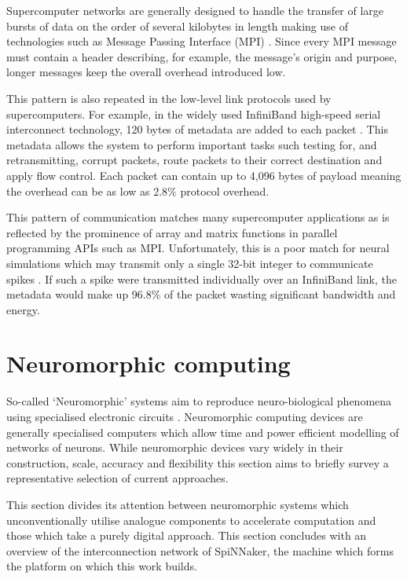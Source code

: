 				Supercomputer networks are generally designed to handle the transfer of
				large bursts of data on the order of several kilobytes in length making
				use of technologies such as Message Passing Interface (MPI)
				\cite{mpiforum12}. Since every MPI message must contain a header
				describing, for example, the message's origin and purpose, longer
				messages keep the overall overhead introduced low.
				
				This pattern is also repeated in the low-level link protocols used by
				supercomputers.  For example, in the widely used InfiniBand
				high-speed serial interconnect technology, 120 bytes of metadata are
				added to each packet \cite{infinibandta08}. This metadata allows the
				system to perform important tasks such testing for, and retransmitting,
				corrupt packets, route packets to their correct destination and apply
				flow control. Each packet can contain up to 4,096 bytes of payload
				meaning the overhead can be as low as 2.8\% protocol overhead.
				
				This pattern of communication matches many supercomputer applications
				as is reflected by the prominence of array and matrix functions in
				parallel programming APIs such as MPI. Unfortunately, this is a poor
				match for neural simulations which may transmit only a single 32-bit
				integer to communicate spikes \cite{davies12}. If such a spike were
				transmitted individually over an InfiniBand link, the metadata would
				make up 96.8\% of the packet wasting significant bandwidth and energy.
				
	
	
	\section{Neuromorphic computing}
		
		So-called `Neuromorphic' systems aim to reproduce neuro-biological phenomena
		using specialised electronic circuits \cite{mead90}. Neuromorphic computing
		devices are generally specialised computers which allow time and power
		efficient modelling of networks of neurons. While neuromorphic devices vary
		widely in their construction, scale, accuracy and flexibility this section
		aims to briefly survey a representative selection of current approaches.
		
		This section divides its attention between neuromorphic systems which
		unconventionally utilise analogue components to accelerate computation and
		those which take a purely digital approach. This section concludes with an
		overview of the interconnection network of SpiNNaker, the machine which
		forms the platform on which this work builds.
		
